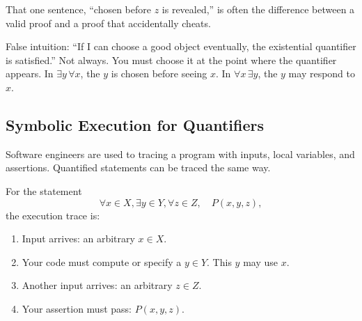 \begin{center}
\end{center}

That one sentence, ``chosen before $z$ is revealed,'' is often the difference between a valid proof and a proof that accidentally cheats.

\begin{trapbox}
False intuition: ``If I can choose a good object eventually, the existential quantifier is satisfied.'' Not always. You must choose it at the point where the quantifier appears. In $\exists y\,\forall x$, the $y$ is chosen before seeing $x$. In $\forall x\,\exists y$, the $y$ may respond to $x$.
\end{trapbox}

\subsection{Symbolic Execution for Quantifiers}

Software engineers are used to tracing a program with inputs, local variables, and assertions. Quantified statements can be traced the same way.

For the statement
\[
\forall x\in X,\exists y\in Y,\forall z\in Z,\quad P(x,y,z),
\]
the execution trace is:

\begin{enumerate}
\item Input arrives: an arbitrary $x\in X$.
\item Your code must compute or specify a $y\in Y$. This $y$ may use $x$.
\item Another input arrives: an arbitrary $z\in Z$.
\item Your assertion must pass: $P(x,y,z)$.
\end{enumerate}

